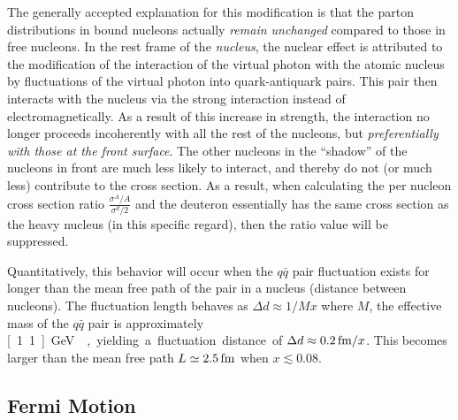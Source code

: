 The generally accepted explanation for this modification is that the parton distributions in bound nucleons actually \emph{remain unchanged} compared to those in free nucleons. In the rest frame of the \emph{nucleus}, the nuclear effect is attributed to the modification of the interaction of the virtual photon with the atomic nucleus by fluctuations of the virtual photon into quark-antiquark pairs. This pair then interacts with the nucleus via the strong interaction instead of electromagnetically. As a result of this increase in strength, the interaction no longer proceeds incoherently with all the rest of the nucleons, but \emph{preferentially with those at the front surface}. The other nucleons in the ``shadow'' of the nucleons in front are much less likely to interact, and thereby do not (or much less) contribute to the cross section. As a result, when calculating the per nucleon cross section ratio $\frac{\sigma^A/A}{\sigma^d/2}$ and the deuteron essentially has the same cross section as the heavy nucleus (in this specific regard), then the ratio value will be suppressed.  

Quantitatively, this behavior will occur when the $q\bar{q}$ pair fluctuation exists for longer than the mean free path of the pair in a nucleus (distance between nucleons). The fluctuation length behaves as $\Delta d \approx 1/Mx$ where $M$, the effective mass of the $q\bar{q}$ pair is approximately \unit[1.1]{GeV}~\cite{Kopeliovich:2012kw}, yielding a fluctuation distance of $\Delta d \approx \unit[0.2]{fm}/x$. This becomes larger than the mean free path $L\simeq\unit[2.5]{fm}$ when $x\lesssim 0.08$.

\subsection{Fermi Motion}

